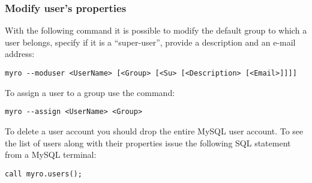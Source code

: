 \documentclass[12pt,titlepage]{article}
\begin{document}
%
\subsubsection{Modify user's properties}
With the following command it is possible to modify the default group
to which a user belongs, specify if it is a ``super-user'', provide a
description and an e-mail address:
%
\begin{verbatim}
myro --moduser <UserName> [<Group> [<Su> [<Description> [<Email>]]]]
\end{verbatim}
%
To assign a user to a group use the command:
%
\begin{verbatim}
myro --assign <UserName> <Group>
\end{verbatim}
%
To delete a user account you should drop the entire MySQL user
account. To see the list of users along with their properties issue
the following SQL statement from a MySQL terminal:
%
\begin{verbatim}
call myro.users();
\end{verbatim}

%
\end{document}
